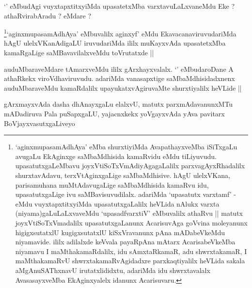 \begin{artha}
`\stext' eMbudAgi vuyxtapxtitxyiMda upasatetxMba varxtavuLaLxvaneMdu Eke ? athaRvirabAradu ? eMdare ?
\end{artha}

\begin{artha}
\footnote{`aginxmupasamAdhAya' eMba shurxtiyiMda AvapathayxveMba iSiTxgaLu avugaLu EkAginxge saMbaMdhisida kamaRvidu eMdu tiLiyuvudu. upasatutxgaLeMbavu joyxVtiSoTxVmAdiyAgagaLalilx parxvagAyxRhadalilx shurxtavAdavu, terxVtAginxgaLige saMbaMdhisive. hAgU ulelxVKana, parisamuhana muMtAdavugaLige saMbaMdhisida kamaRvu idu, upasatutxgaLige ivu saMBavisuvudilalx. adariMda `upasatutx varxtamf' - eMdu vuyxtapxtitxyiMda upasatutxgaLalilx heVLida nAlukx varxta (niyama)gaLuLaLxvaveMdu `upasadfvarxtiV' eMbuvalilx athaRvu || matutx joyxVtiSoTxVmadalilx upasatutxgaLanunx AcarisuvAga goVvina moleyanunx higigxsutatxlU kugigxsutatxlU kiSxVravanunx pAna mADabeVkeMdu niyamavide. ililx adilalxde keVvala payaRpAna mAtarx AcarisabeVkeMba niyamavu I maMthakamaRdalilx, idu sAmxtaRkamaR, adu shwrxtakamaR, I maMthakamaRvU shwrxtakamaRvAgidadxre parxkaqtiyalilx heVLida sakala aMgAnuSAThxnavU irutatxlididxtu, adariMda idu shwrxtavalalx AvasasayxveMba EkAginxyalelx idanunx Acarisuvaru.}`aginxmupasamAdhAya' eMbuvalilx aginxyf' eMdu EkavacanaviruvudariMda hAgU ulelxVKanAdigaLU iruvudariMda ililx muKayxvAda upasatetxMba kamaRgaLige saMBavavilalxveMdu toVrutatxde ||
\end{artha}


\begin{artha}
auduMbaraveMdare tAmarxveMdu ililx gArxhayxvalalx. `\stext' eMbudaroDane A athaRkekx viroVdhaviruvudu. adariMda vanasapxtige saMbaMdhisidadxnenx auduMbaraveMdu kamaRdalilx upayukatxvAgiruvaMte shurxtiyalilx heVLide ||
\end{artha}


\begin{artha}
gArxmayxvAda dasha dhAnayxgaLu elalxvU, matutx parxmAdavanunxMTu mADadiruva Pala puSapxgaLU, yajacnxkekx yoVgayxvAda yAva pavitarx BoVjayxvasutxgaLiveyo 
\end{artha}


